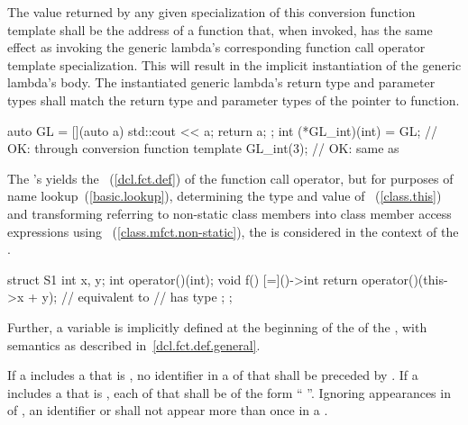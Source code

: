 \exitexample
The value returned by any given specialization of this conversion function
template shall be the address of a function that, when invoked, has the same
effect as invoking the generic lambda's corresponding function call operator
template specialization.
\enternote
This will result in the implicit instantiation of the generic lambda's body.
The instantiated generic lambda's return type and parameter types shall match
the return type and parameter types of the pointer to function.
\exitnote
\enterexample
\begin{codeblock}
auto GL = [](auto a) { std::cout << a; return a; };
int (*GL_int)(int) = GL;  // OK: through conversion function template
GL_int(3);                // OK: same as 
\end{codeblock}
\exitexample

\pnum
The 's  yields the
~(\ref{dcl.fct.def}) of the function call operator, but for
purposes of name lookup~(\ref{basic.lookup}), determining the type and value of
~(\ref{class.this}) and transforming 
referring to non-static class members into class member access expressions using
~(\ref{class.mfct.non-static}), the  is
considered in the context of the . \enterexample

\begin{codeblock}
struct S1 {
  int x, y;
  int operator()(int);
  void f() {
    [=]()->int {
      return operator()(this->x + y); // equivalent to 
                                      //  has type 
    };
  }
};
\end{codeblock}
\exitexample
Further, a variable  is implicitly defined at the beginning of
the  of the ,
with semantics as described in~\ref{dcl.fct.def.general}.

\pnum
If a  includes a  that
is \tcode{\&}, no identifier in a  of that
 shall be preceded
by \tcode{\&}. If a  includes a
 that is \tcode{=}, each
 of that  shall
be of the form ``\tcode{\&} ''. Ignoring appearances in
 of , an identifier or
 shall not appear more than once in a
. \enterexample

